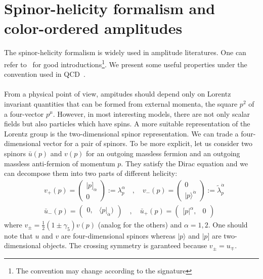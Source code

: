 \section{Spinor-helicity formalism and color-ordered amplitudes}\label{sect-spinor}
The spinor-helicity formalism is widely used in amplitude literatures. 
One can refer to~\cite{Dixon:1996wi,Elvang:2013cua} for good introductions\footnote{The convention may change according to the signature}.
We present some useful properties under the convention used in QCD~\cite{Dixon:1996wi}.
\\\\
From a physical point of view, ampitudes should depend only on Lorentz invariant quantities that can be formed from external momenta, \eg the square $p^2$ of a four-vector $p^\mu$.
However, in most interesting models, there are not only scalar fields but also particles which have spins. 
A more suitable representation of the Lorentz group is the two-dimensional spinor representation.
We can trade a four-dimensional vector for a pair of spinors.
To be more explicit, let us consider two spinors $\bar{u}(p)$ and $v(p)$ for an outgoing massless fermion and an outgoing massless anti-fermion of momentum $p$.
They satisfy the Dirac equation and we can decompose them into two parts of different helicity:
\begin{equation}
\begin{split}
& v_+(p) = \begin{pmatrix}
|p]_\alpha \\ 0
\end{pmatrix} := \lambda_p^\alpha
\quad,\quad
v_-(p) = \begin{pmatrix}
0 \\ |p\rangle^{\dot{\alpha}}
\end{pmatrix} := \tilde{\lambda}_p^{\dot{\alpha}}
\\
& \bar{u}_-(p) = \begin{pmatrix} 
0, & \langle p |_{\dot{\alpha}})\end{pmatrix}
\quad,\quad
\bar{u}_+(p) = \begin{pmatrix} [ p|^\alpha, & 0 \end{pmatrix}
\end{split}
\end{equation} 
where $v_\pm = \frac{1}{2}(1\pm\gamma_5)v(p)$ (analog for the others) and $\alpha = 1,2$.
One should note that $u$ and $v$ are four-dimensional spinors whereas $|p\rangle$ and $|p]$ are two-dimensional objects. 
The crossing symmetry is garanteed because $v_\pm = u_\mp$.
